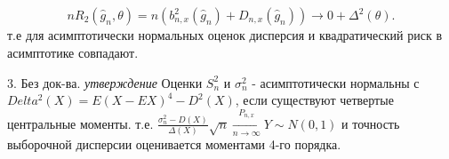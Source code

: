 \[
  nR_2(\hat{g}_n, \theta) = n(b_{n, x}^2(\hat{g}_n) + D_{n, x}(\hat{g}_n)) \xrightarrow[]{} 0 + \Delta^2(\theta)
.\]
т.е для асимптотически нормальных оценок дисперсия и квадратический риск в асимптотике совпадают.

3. Без док-ва. \textit{утверждение} Оценки $S^2_n$ и $\sigma^2_n$ - асимптотически нормальны с $Delta^2(X) = E(X - EX)^4 - D^2(X)$, если существуют четвертые центральные моменты.
т.е. $\frac{\sigma^2_n - D(X)}{\Delta(X)}\sqrt{n} \xrightarrow[n \to \infty]{P_{n, x}} Y \sim N(0, 1)$ и точность выборочной дисперсии оценивается моментами 4-го порядка.
